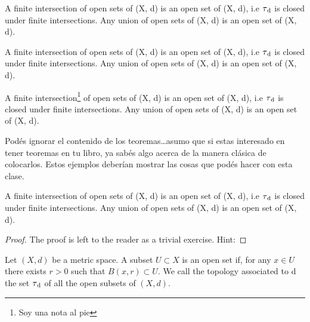 \begin{theorem}
    A finite intersection of open sets of (X, d) is an open set of (X, d), i.e $\tau\textsubscript{d}$ is closed under finite intersections. Any union of open sets of (X, d) is an open set of (X, d).
\end{theorem}

\begin{proposition}
    A finite intersection of open sets of (X, d) is an open set of (X, d), i.e $\tau\textsubscript{d}$ is closed under finite intersections. Any union of open sets of (X, d) is an open set of (X, d).
\end{proposition}

\begin{lemma}
    A finite intersection\footnote{Soy una nota al pie} of open sets of (X, d) is an open set of (X, d), i.e $\tau\textsubscript{d}$ is closed under finite intersections. Any union of open sets of (X, d) is an open set of (X, d).
\end{lemma}

Podés ignorar el contenido de los teoremas\ldots asumo que si estas interesado en tener teoremas en tu libro, ya sabés algo acerca de la manera clásica de colocarlos. Estos ejemplos deberían mostrar las cosas que podés hacer con esta clase.

\begin{corollary}
    A finite intersection of open sets of (X, d) is an open set of (X, d), i.e $\tau\textsubscript{d}$ is closed under finite intersections. Any union of open sets of (X, d) is an open set of (X, d).
\end{corollary}

\begin{proof}
    The proof is left to the reader as a trivial exercise. Hint: \blindtext
\end{proof}

\begin{definition}
Let $(X, d)$ be a metric space. A subset $U \subset X$ is an open set if, for any $x \in U$ there exists $r > 0$ such that $B(x, r) \subset U$. We call the topology associated to d the set $\tau\textsubscript{d}$ of all the open subsets of $(X, d).$
\end{definition}

